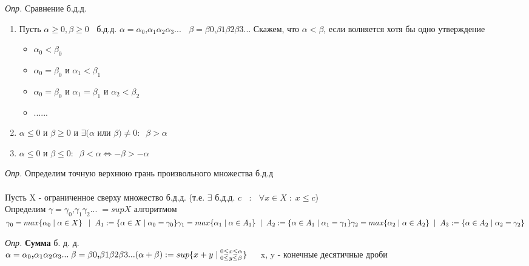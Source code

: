 \documentclass[a4paper, 12pt]{article}
\begin{document}
    \textit{Опр.} Сравнение б.д.д.
    \begin{enumerate}
        \item Пусть $\alpha \ge 0, \beta \ge 0 \;\;$ б.д.д.
        $\alpha = \alpha_{0}\textbf{,}\alpha_{1}\alpha_{2}\alpha_{3}... \;\;$
        $\beta = \beta{0}\textbf{,}\beta{1}\beta{2}\beta{3}... $
        Скажем, что $ \alpha < \beta $, если волняется хотя бы одно утверждение
        \begin{itemize}
            \item $ \alpha_{0} < \beta_{0} $
            \item $ \alpha_{0} = \beta_{0} $ и $ \alpha_{1} < \beta_{1} $
            \item $ \alpha_{0} = \beta_{0} $ и $ \alpha_{1} = \beta_{1} $ и $ \alpha_{2} < \beta_{2} $
            \item ......
        \end{itemize}
        \item $ \alpha \le 0 $ и $ \beta \ge 0 $ и $\exists (\alpha$ или $ \beta) \ne 0 : \;\; \beta > \alpha$
        \item $ \alpha \le 0 $ и $ \beta \le 0 :\;\; \beta < \alpha \Leftrightarrow -\beta > -\alpha$
    \end{enumerate}
    \textit{Опр.} Определим точную верхнюю грань произвольного множества б.д.д\\
    \\
    Пусть X - ограниченное сверху множество б.д.д. (т.е. $\exists$ б.д.д. $c\;\;$ : $\;\; \forall x \in X \; : \; x \le c$)\\
    Определим $\gamma = \gamma_{0}\textbf{,}\gamma_{1}\gamma_{2} ... \; = sup X $ алгоритмом
    \\
    $ \gamma_{0} = max \{\alpha_{0} \;|\; \alpha \in X\} \;\;\;|\;\; A_{1} := \{\alpha \in X \;|\; \alpha_{0} = \gamma_{0}\}\\
    \gamma_{1} = max \{\alpha_{1} \;|\; \alpha \in A_{1}\} \;\;|\;\; A_{2} := \{\alpha \in A_{1} \;|\; \alpha_{1} = \gamma_{1}\}\\
    \gamma_{2} = max \{\alpha_{2} \;|\; \alpha \in A_{2}\} \;\;|\;\; A_{3} := \{\alpha \in A_{2} \;|\; \alpha_{2} = \gamma_{2}\}\\$

    \textit{Опр.} \textbf{Сумма} б. д. д.\\
    $\alpha = \alpha_{0}\textbf{,}\alpha_{1}\alpha_{2}\alpha_{3}... \;\;\\
    \beta = \beta{0}\textbf{,}\beta{1}\beta{2}\beta{3}...  \\
    (\alpha + \beta) := sup\{x + y \;|\;^{0 \le x \le \alpha}_{0 \le y \le \beta}\} \;\;\;\;$ x, y - конечные десятичные дроби\\
\end{document}
